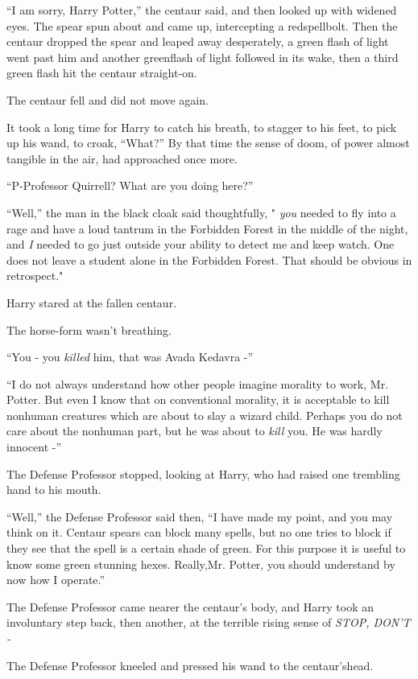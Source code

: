 ``I am sorry, Harry Potter,'' the centaur said, and then looked up with widened eyes. The spear spun about and came up, intercepting a redspellbolt. Then the centaur dropped the spear and leaped away desperately, a green flash of light went past him and another greenflash of light followed in its wake, then a third green flash hit the centaur straight-on.

The centaur fell and did not move again.

It took a long time for Harry to catch his breath, to stagger to his feet, to pick up his wand, to croak, ``What?''
By that time the sense of doom, of power almost tangible in the air, had approached once more.

``P-Professor Quirrell? What are you doing here?''

``Well,'' the man in the black cloak said thoughtfully, " \emph{you} needed to fly into a rage and have a loud tantrum in the Forbidden Forest in the middle of the night, and \emph{I} needed to go just outside your ability to detect me and keep watch. One does not leave a student alone in the Forbidden Forest. That should be obvious in retrospect."

Harry stared at the fallen centaur.

The horse-form wasn't breathing.

``You - you \emph{killed} him, that was Avada Kedavra -''

``I do not always understand how other people imagine morality to work, Mr. Potter. But even I know that on conventional morality, it is acceptable to kill nonhuman creatures which are about to slay a wizard child. Perhaps you do not care about the nonhuman part, but he was about to \emph{kill} you. He was hardly innocent -''

The Defense Professor stopped, looking at Harry, who had raised one trembling hand to his mouth.

``Well,'' the Defense Professor said then, ``I have made my point, and you may think on it. Centaur spears can block many spells, but no one tries to block if they see that the spell is a certain shade of green. For this purpose it is useful to know some green stunning hexes. Really,Mr. Potter, you should understand by now how I operate.''

The Defense Professor came nearer the centaur's body, and Harry took an involuntary step back, then another, at the terrible rising sense of \emph{STOP, DON'T -}

The Defense Professor kneeled and pressed his wand to the centaur'shead.

